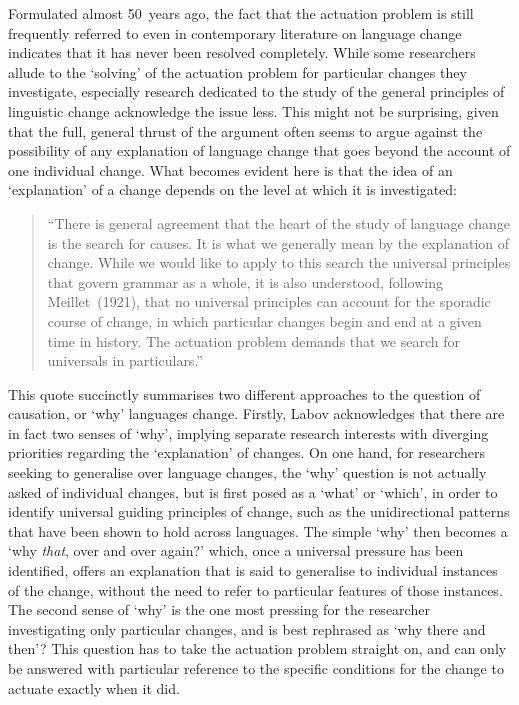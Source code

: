 Formulated almost 50~years ago, the fact that the actuation problem is still frequently referred to even in contemporary literature on language change indicates that it has never been resolved completely. While some researchers allude to the `solving' of the actuation problem for particular changes they investigate\citep[e.g.][]{Baker2011,Stevens2013}, especially research dedicated to the study of the general principles of linguistic change acknowledge the issue less. This might not be surprising, given that the full, general thrust of the argument often seems to argue against the possibility of any explanation of language change that goes beyond the account of one individual change. What becomes evident here is that the idea of an `explanation' of a change depends on the level at which it is investigated:

\begin{quote}
``There is general agreement that the heart of the study of language change is the search for causes. It is what we generally mean by the explanation of change. While we would like to apply to this search the universal principles that govern grammar as a whole, it is also understood, following Meillet~(1921), that no universal principles can account for the sporadic course of change, in which particular changes begin and end at a given time in history. The actuation problem demands that we search for universals in particulars.''~\citep[p.90]{Labov2010}
\end{quote}

This quote succinctly summarises two different approaches to the question of causation, or `why' languages change. Firstly, Labov acknowledges that there are in fact two senses of `why', implying separate research interests with diverging priorities regarding the `explanation' of changes. On one hand, for researchers seeking to generalise over language changes, the `why' question is not actually asked of individual changes, but is first posed as a `what' or `which', in order to identify universal guiding principles of change, such as the unidirectional patterns that have been shown to hold across languages. The simple `why' then becomes a `why \emph{that}, over and over again?' which, once a universal pressure has been identified, offers an explanation that is said to generalise to individual instances of the change, without the need to refer to particular features of those instances. The second sense of `why' is the one most pressing for the researcher investigating only particular changes, and is best rephrased as `why there and then'? This question has to take the actuation problem straight on, and can only be answered with particular reference to the specific conditions for the change to actuate exactly when it did.

